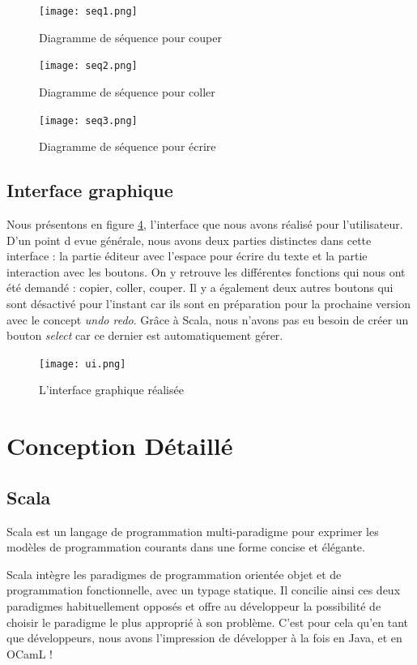 \documentclass[a4paper,11pt]{article}
\begin{document}
\begin{figure}[!ht]
		\center
		\texttt{[image: seq1.png]}
		\caption{Diagramme de séquence pour couper}
		\label{seq1}
\end{figure}

\begin{figure}[!ht]
		\center
		\texttt{[image: seq2.png]}
		\caption{Diagramme de séquence pour coller}
		\label{seq2}
\end{figure}

\begin{figure}[!ht]
		\center
		\texttt{[image: seq3.png]}
		\caption{Diagramme de séquence pour écrire}
		\label{seq3}
\end{figure}

\subsection{Interface graphique}
Nous présentons en figure \ref{ui}, l'interface que nous avons réalisé pour l'utilisateur. 
D'un point d evue générale, nous avons deux parties distinctes dans cette interface : la partie éditeur avec l'espace pour écrire du texte et la partie interaction avec les boutons. On y retrouve les différentes fonctions qui nous ont été demandé : copier, coller, couper. 
Il y a également deux autres boutons qui sont désactivé pour l'instant car ils sont en préparation pour la prochaine version avec le concept \textit{undo redo}. Grâce à Scala, nous n'avons pas eu besoin de créer un bouton \textit{select} car ce dernier est automatiquement gérer.
\begin{figure}[!ht]
		\center
		\texttt{[image: ui.png]}
		\caption{L'interface graphique réalisée}
		\label{ui}
\end{figure}


\newpage
\section{Conception Détaillé}

\subsection{Scala}

Scala est un langage de programmation multi-paradigme pour exprimer les modèles de programmation courants dans une forme concise et élégante.

Scala intègre les paradigmes de programmation orientée objet et de programmation fonctionnelle, avec un typage statique. Il concilie ainsi ces deux paradigmes habituellement opposés et offre au développeur la possibilité de choisir le paradigme le plus approprié à son problème. C'est pour cela qu'en tant que développeurs, nous avons l'impression de développer à la fois en Java, et en OCamL !
\end{document}

